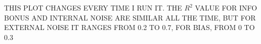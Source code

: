 \documentclass[12pt]{article}
\begin{document}
	THIS PLOT CHANGES EVERY TIME I RUN IT. THE $R^2$ VALUE FOR INFO BONUS AND INTERNAL NOISE ARE SIMILAR ALL THE TIME, BUT FOR EXTERNAL NOISE IT RANGES FROM 0.2 TO 0.7, FOR BIAS, FROM 0 TO 0.3
	
	
	
	
	
	
	
	\cleardoublepage
	\ifdefined{}
	\else
	\fi
	
\end{document}
